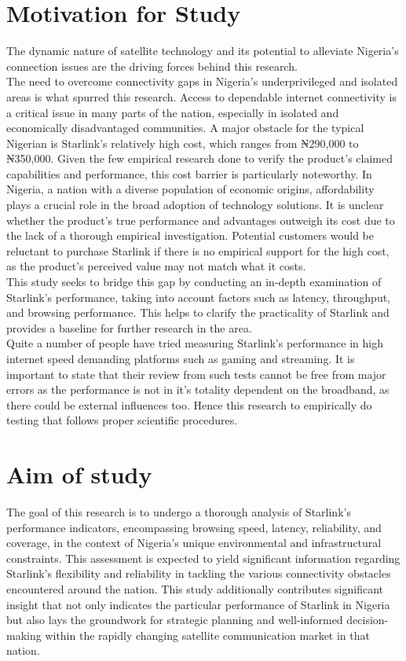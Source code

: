 \section{Motivation for Study}
The dynamic nature of satellite technology and its potential to alleviate Nigeria's connection issues are the driving forces behind this research.\\
The need to overcome connectivity gaps in Nigeria's underprivileged and  isolated areas is what spurred this research. Access to dependable internet connectivity is a critical issue in many parts of the nation, especially in isolated and economically disadvantaged communities.
A major obstacle for the typical Nigerian is Starlink's relatively high cost, which ranges from ₦290,000 to ₦350,000. Given the few empirical research done to verify the product's claimed capabilities and performance, this cost barrier is particularly noteworthy. In Nigeria, a nation with a diverse population of economic origins, affordability plays a crucial role in the broad adoption of technology solutions. It is unclear whether the product's true performance and advantages outweigh its cost due to the lack of a thorough empirical investigation. Potential customers would be reluctant to purchase Starlink if there is no empirical support for the high cost, as the product's perceived value may not match what it costs.\\
This study seeks to bridge this gap by conducting an in-depth examination of Starlink's performance, taking into account factors such as latency, throughput, and browsing performance. This helps to clarify the practicality of Starlink and provides a baseline for further research in the area.\\
Quite a number of people have tried measuring Starlink's performance in high internet speed demanding platforms such as gaming and streaming. It is important to state that their review from such tests cannot be free from major errors as the performance is not in it's totality dependent on the broadband, as there could be external influences too. Hence this research to empirically do testing that follows proper scientific procedures.

\section{Aim of study}
The goal of this research is to undergo a thorough analysis of Starlink's performance indicators, encompassing browsing speed, latency, reliability, and coverage, in the context of Nigeria's unique environmental and infrastructural constraints. This assessment is expected to yield significant information regarding Starlink's flexibility and reliability in tackling the various connectivity obstacles encountered around the nation. This study additionally contributes significant insight that not only indicates the particular performance of Starlink in Nigeria but also lays the groundwork for strategic planning and well-informed decision-making within the rapidly changing satellite communication market in that nation.

